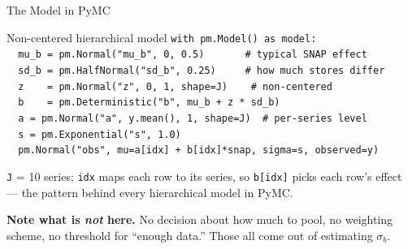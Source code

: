 \documentclass[aspectratio=169, 11pt]{beamer}
\begin{document}
\begin{frame}{The Model in PyMC}
  \begin{examplebox}{Non-centered hierarchical model}
    {\tiny\linespread{1.05}\selectfont
    \texttt{with pm.Model() as model:}\\
    \texttt{\mbox{}\ \ mu\_b = pm.Normal("mu\_b", 0, 0.5)\ \ \ \ \ \ \ \# typical SNAP effect}\\
    \texttt{\mbox{}\ \ sd\_b = pm.HalfNormal("sd\_b", 0.25)\ \ \ \ \ \# how much stores differ}\\
    \texttt{\mbox{}\ \ z\ \ \ \ = pm.Normal("z", 0, 1, shape=J)\ \ \ \ \# non-centered}\\
    \texttt{\mbox{}\ \ b\ \ \ \ = pm.Deterministic("b", mu\_b + z * sd\_b)}\\[2pt]
    \texttt{\mbox{}\ \ a = pm.Normal("a", y.mean(), 1, shape=J)\ \ \# per-series level}\\
    \texttt{\mbox{}\ \ s = pm.Exponential("s", 1.0)}\\[2pt]
    \texttt{\mbox{}\ \ pm.Normal("obs", mu=a[idx] + b[idx]*snap, sigma=s, observed=y)}
    }
  \end{examplebox}
  \texttt{J} = 10 series; \texttt{idx} maps each row to its series, so \texttt{b[idx]} picks each row's
  effect --- the pattern behind every hierarchical model in PyMC.

  \textbf{Note what is \emph{not} here.} No decision about how much to pool, no weighting scheme,
  no threshold for ``enough data.'' Those all come out of estimating $\sigma_b$.
\end{frame}
\end{document}

